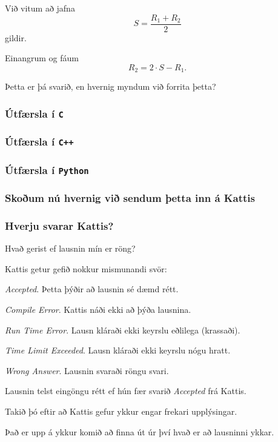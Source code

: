 {
	{
		\item<1-> Við vitum að jafna
		\[
			S = \frac{R_1 + R_2}{2}
		\]
		gildir.
		\item<2-> Einangrum og fáum
		\[
			R_2 = 2 \cdot S - R_1.
		\]
		\item<3-> Þetta er þá svarið, en hvernig myndum við forrita þetta?
	}
}

{
	\frametitle{Útfærsla í \texttt{C}}
}

{
	\frametitle{Útfærsla í \texttt{C++}}
}

{
	\frametitle{Útfærsla í \texttt{Python}}
}

{
	\frametitle{Skoðum nú hvernig við sendum þetta inn á Kattis}
}

{
	\frametitle{Hverju svarar Kattis?}
	{
		\item<1-> Hvað gerist ef lausnin mín er röng?
		\item<2-> Kattis getur gefið nokkur mismunandi svör:
		\item<3-> \emph{Accepted}. Þetta þýðir að lausnin sé dæmd rétt.
		\item<4-> \emph{Compile Error}. Kattis náði ekki að þýða lausnina.
		\item<5-> \emph{Run Time Error}. Lausn kláraði ekki keyrslu eðlilega (krassaði).
		\item<6-> \emph{Time Limit Exceeded}. Lausn kláraði ekki keyrslu nógu hratt.
		\item<7-> \emph{Wrong Answer}. Lausnin svaraði röngu svari.
		\item<8-> Lausnin telst eingöngu rétt ef hún fær svarið \emph{Accepted} frá Kattis.
	}
}

{
	{
		\item<1-> Takið þó eftir að Kattis gefur ykkur engar frekari upplýsingar.
		\item<2-> Það er upp á ykkur komið að finna út úr því hvað er að lausninni ykkar.
	}
}

{
}



